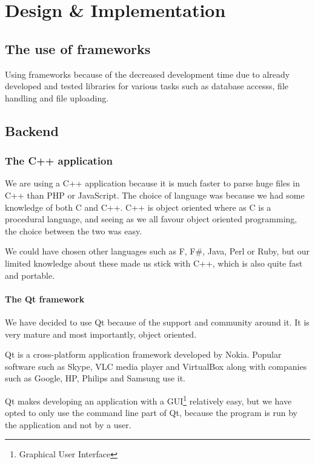 \chapter{Design \& Implementation}
\label{sec:design_and_implementation}
\section{The use of frameworks}
\label{sec:the_use_of_frameworks}
Using frameworks because of the decreased development time due to already developed and tested libraries for various tasks such as database accesss, file handling and file uploading.

\section{Backend}
\label{sec:backend}
\subsection{The C++ application}
\label{sec:the_cpp_application}
We are using a C++ application because it is much faster to parse huge files in C++ than PHP or JavaScript.
The choice of language was because we had some knowledge of both C and C++. C++ is object oriented where as C is a procedural language, and seeing as we all favour object oriented programming, the choice between the two was easy.

We could have chosen other languages such as F, F\#, Java, Perl or Ruby, but our limited knowledge about these made us stick with C++, which is also quite fast and portable.

\subsubsection{The Qt framework}
\label{sec:the_qt_framework}
We have decided to use Qt because of the support and community around it. It is very mature and most importantly, object oriented.

Qt is a cross-platform application framework developed by Nokia. Popular software such as Skype, VLC media player and VirtualBox along with companies such as Google, HP, Philips and Samsung use it.

Qt makes developing an application with a GUI\footnote{Graphical User Interface} relatively easy, but we have opted to only use the command line part of Qt, because the program is run by the application and not by a user.


